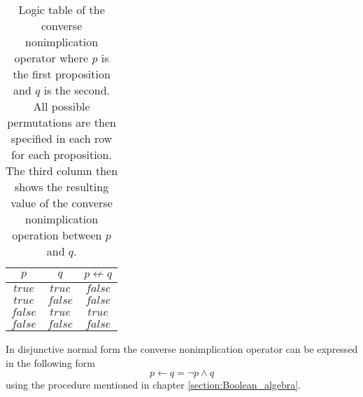         \begin{table}[h!]
            \centering
            \begin{tabular}{|c|c|c|}
            	\hline
            	  $p$   &   $q$   & $p \not\leftarrow q$ \\ \hline
            	$true$  & $true$  &       $false$        \\ \hline
            	$true$  & $false$ &       $false$        \\ \hline
            	$false$ & $true$  &        $true$        \\ \hline
            	$false$ & $false$ &       $false$        \\ \hline
            \end{tabular}
            \caption{Logic table of the converse nonimplication operator where $p$ is the first proposition and $q$ is the second. All possible permutations are then specified in each row for each proposition. The third column then shows the resulting value of the converse nonimplication operation between $p$ and $q$.}
            \label{LogicTable:CNI}
        \end{table}
        
        In disjunctive normal form the converse nonimplication operator can be expressed in the following form
        \begin{equation}
            p \leftarrow q =\neg p \wedge q
        \end{equation}
        using the procedure mentioned in chapter \ref{section:Boolean_algebra}.